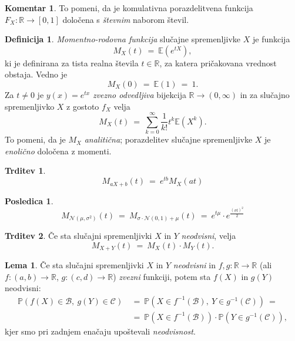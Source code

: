 \documentclass[11pt]{article}
\newcommand{\p}{\mathbb{P}}
\newcommand{\E}{\mathbb{E}}
\newcommand{\R}{\mathbb{R}}
\newcommand{\1}{\mathbbm{1}}
\newcommand{\n}{\mathcal{N}}
\newcommand{\B}{\mathcal{B}}
\newcommand{\C}{\mathcal{C}}
\theoremstyle{definition}
\newtheorem{definicija}{Definicija}[section]
\theoremstyle{definition}
\newtheorem{trditev}{Trditev}[section]
\theoremstyle{definition}
\newtheorem*{posledica}{Posledica}
\newtheorem*{komentar}{Komentar}
\newtheorem{lema}{Lema}
\begin{document}
\begin{komentar}

To pomeni, da je komulativna porazdelitvena funkcija $F_X: \R \rightarrow [0, 1]$ določena s \textit{števnim} naborom števil.

\end{komentar}
\vspace{0.5cm}

\begin{definicija}

\textit{Momentno-rodovna funkcija} slučajne spremenljivke $X$ je funkcija
$$M_X(t) ~=~ \E(e^{tX}),$$
ki je definirana za tista realna števila $t \in \R$, za katera pričakovana vrednost obstaja. Vedno je
$$M_X(0) ~=~ \E(1) ~=~ 1.$$
Za $t \neq 0$ je $y(x) = e^{tx}$ \textit{zvezno odvedljiva} bijekcija $\R \rightarrow (0, \infty)$ in za slučajno spremenljivko $X$ z gostoto $f_X$ velja
$$M_X(t) ~=~ \sum_{k=0}^\infty \frac{1}{k!} t^k \E(X^k).$$
To pomeni, da je $M_X$ \textit{analitična}; porazdelitev slučajne spremenljivke $X$ je \textit{enolično} določena z momenti.

\end{definicija}
\vspace{0.5cm}

\begin{trditev}

$$M_{aX+b}(t) ~=~ e^{tb} M_X(at)$$

\end{trditev}
\vspace{0.5cm}

\begin{posledica}

$$M_{\n(\mu, \sigma^2)}(t) ~=~ M_{\sigma \cdot \n(0, 1) + \mu}(t) ~=~ e^{t\mu} \cdot e^{\frac{(\sigma t)^2}{2}}$$

\end{posledica}
\vspace{0.5cm}

\begin{trditev}

Če sta slučajni spremenljivki $X$ in $Y$ \textit{neodvisni}, velja
$$M_{X+Y}(t) ~=~ M_X(t) \cdot M_Y(t).$$

\end{trditev}
\vspace{0.5cm}

\begin{lema}

Če sta slučajni spremenljivki $X$ in $Y$ \textit{neodvisni} in $f, g: \R \rightarrow \R$ (ali $f: (a, b) \rightarrow \R$, $g: (c, d) \rightarrow \R$) \textit{zvezni} funkciji, potem sta $f(X)$ in $g(Y)$ neodvisni:
\begin{align*}
\p(f(X) \in \B, ~g(Y) \in \C) ~&=~ \p(X \in f^{-1}(\B), ~Y \in g^{-1}(\C)) ~=~ \\
~&=~ \p(X \in f^{-1}(\B)) \cdot \p(Y \in g^{-1}(\C)),
\end{align*}
kjer smo pri zadnjem enačaju upoštevali \textit{neodvisnost}.

\end{lema}
\vspace{0.5cm}
\end{document}
